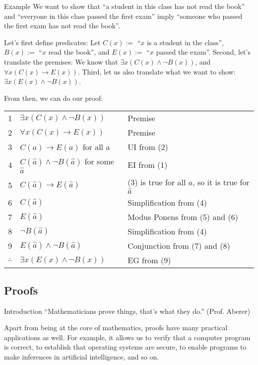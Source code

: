 \documentclass{article}
\begin{document}
\begin{parag}{Example}
    We want to show that ``a student in this class has not read the book'' and ``everyone in this class passed the first exam'' imply ``someone who passed the first exam has not read the book''.

    Let's first define predicates: Let $C\left(x\right) := $ ``$x$ is a student in the class'', $B\left(x\right) := $ ``$x$ read the book'', and $E\left(x\right) := $ ``$x$ passed the exam''. Second, let's translate the premises: We know that $\exists x \left(C\left(x\right) \land \lnot B\left(x\right)\right)$, and $\forall x \left(C\left(x\right) \to E\left(x\right)\right)$. Third, let us also translate what we want to show: $\exists x \left(E\left(x\right) \land \lnot B\left(x\right)\right)$.

    From then, we can do our proof:
    \begin{center}
    \begin{tabular}{rll}
        1 & $\exists x \left(C\left(x\right) \land \lnot B\left(x\right)\right)$ & Premise  \\
        2 & $\forall x \left(C\left(x\right) \to E\left(x\right)\right)$ & Premise  \\
        3 & $C\left(a\right) \to E\left(a\right)$ for all a & UI from (2)  \\
        4 & $C\left(\hat{a}\right) \land \lnot B\left(\hat{a}\right)$ for some $\hat{a}$ & EI from (1)  \\
        5 & $C\left(\hat{a}\right) \to E\left(\hat{a}\right)$ & (3) is true for all $a$, so it is true for $\hat{a}$ \\
        6 & $C\left(\hat{a}\right)$ & Simplification from (4) \\
        7 & $E\left(\hat{a}\right)$ & Modus Ponens from (5) and (6) \\
        8 & $\lnot B\left(\hat{a}\right)$ & Simplification from (4) \\
        9 & $E\left(\hat{a}\right) \land \lnot B\left(\hat{a}\right)$ & Conjunction from (7) and (8) \\
        \hline
        $\therefore$ & $\exists x\left(E\left(x\right) \land\lnot B\left(x\right)\right)$ & EG from (9)
    \end{tabular}
    \end{center}
\end{parag}


\subsection{Proofs}
\begin{parag}{Introduction}
    ``Mathematicians prove things, that's what they do.'' (Prof. Aberer)

    Apart from being at the core of mathematics, proofs have many practical applications as well. For example, it allows us to verify that a computer program is correct, to establish that operating systems are secure, to enable programs to make inferences in artificial intelligence, and so on.
\end{parag}
\end{document}
